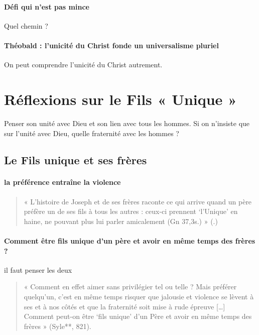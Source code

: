\paragraph{Défi qui n'est pas mince} Quel chemin ?

\paragraph{Théobald : l'unicité du Christ fonde un universalisme pluriel} On peut comprendre l'unicité du Christ autrement. 


\section{Réflexions sur le Fils « Unique »}

Penser son unité avec Dieu et son lien avec tous les hommes. Si on n'insiste que sur l'unité avec Dieu, quelle fraternité avec les hommes ?

\subsection{Le Fils unique et ses frères}

\paragraph{la préférence entraîne la violence}

\begin{quote}
   « L’histoire de Joseph et de ses frères raconte ce qui arrive quand un père préfère un de ses fils à tous les autres : ceux-ci prennent ‘l’Unique’ en haine, ne pouvant plus lui parler amicalement (Gn 37,3s.) » (\citep[p. 821]{theobald_christianisme_2007}.) 
\end{quote}
 
\paragraph{Comment être fils unique d'un père et avoir en même temps des frères ?} il faut penser les deux
\begin{quote}
    « Comment en effet aimer sans privilégier tel ou telle ? Mais préférer quelqu’un, c’est en même temps risquer que jalousie et violence se lèvent à ses et à nos côtés et que la fraternité soit mise à rude épreuve  […] Comment peut-on être ‘fils unique’ d’un Père et avoir en même temps des frères » (Syle**, 821).
\end{quote}

